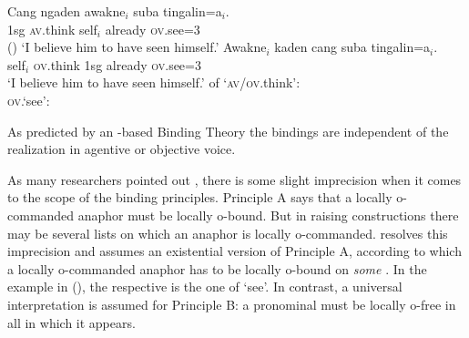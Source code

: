 \documentclass[output=paper,biblatex,babelshorthands,newtxmath,draftmode,colorlinks,citecolor=brown]{langscibook}
\begin{document}
\eal
\ex 
\gll Cang ngaden awakne$_i$ suba tingalin=a$_i$.\\
    1sg \textsc{av}.think self$_i$ already \textsc{ov}.see=3\\\hfill()
\glt `I believe him to have seen himself.'
\ex
\gll Awakne$_i$ kaden cang suba tingalin=a$_i$.\\
     self$_i$   \textsc{ov}.think 1sg already \textsc{ov}.see=3\\
\glt `I believe him to have seen himself.'
\ex \argst of `\textsc{av}/\textsc{ov}.think':\\
\ex \textsc{ov}.`see':\\
\zl

\noindent
As predicted by an \argst-based Binding Theory the bindings are independent of the realization in
agentive or objective voice.

As many researchers pointed out \parencites[Section~5]{NB96a}[Section~20.4.2]{Mueller99a}, there is some slight imprecision when it comes to the scope of the
binding principles. Principle A says that a locally o-commanded anaphor must be locally o-bound. But in raising
constructions there may be several lists on which an anaphor is locally
o-commanded. \citet{Wechsler99a} resolves this imprecision and assumes an existential version of
Principle A, according to which a locally o-commanded anaphor has to be locally o-bound on
\emph{some} \argst. In the example in (), the respective \argstl is the one of `see'. In
contrast, a universal interpretation is assumed for Principle B: a pronominal must be locally o-free
in all \argstls in which it appears.
\end{document}
